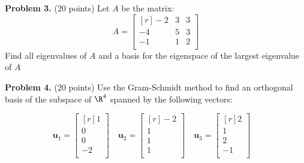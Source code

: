 \documentclass[12pt]{article}
\begin{document}
\clearpage


\textbf{Problem 3.} (20 points) 
Let $A$ be the matrix:
\[A=
\begin{bmatrix*}[r]-2&3&3\\-4&5&3\\-1&1&2\\\end{bmatrix*}
\]
Find all eigenvalues of $A$ and a basis for the eigenspace of the largest eigenvalue of $A$


\clearpage

\textbf{Problem 4.} (20 points) 
Use the Gram-Schmidt method to find an orthogonal basis of the subspace 
of $\R^{4}$ spanned by the following vectors:

\[
\mathbf{u}_1=\begin{bmatrix*}[r]1\\ 0\\ 0\\ -2\\ \end{bmatrix*}\quad
\mathbf{u}_2=\begin{bmatrix*}[r]-2\\ 1\\ 1\\ 1\\ \end{bmatrix*}\quad
\mathbf{u}_3=\begin{bmatrix*}[r]2\\ 1\\ 2\\ -1\\ \end{bmatrix*}\quad
\]

\end{document}
